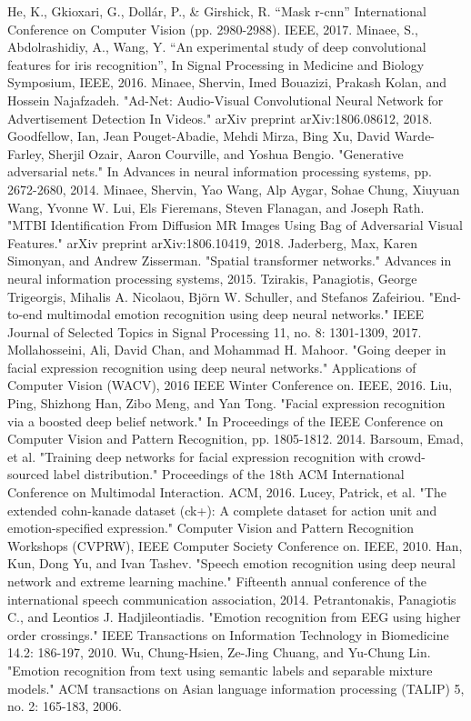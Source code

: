 \documentclass[conference]{IEEEtran}
\begin{document}
\begin{thebibliography}{1}
He, K., Gkioxari, G., Dollár, P., \& Girshick, R. ``Mask r-cnn'' International Conference on Computer Vision (pp. 2980-2988). IEEE, 2017.
Minaee, S., Abdolrashidiy, A.,  Wang, Y. ``An experimental study of deep convolutional features for iris recognition'', In Signal Processing in Medicine and Biology Symposium, IEEE, 2016.
Minaee, Shervin, Imed Bouazizi, Prakash Kolan, and Hossein Najafzadeh. "Ad-Net: Audio-Visual Convolutional Neural Network for Advertisement Detection In Videos." arXiv preprint arXiv:1806.08612, 2018.
Goodfellow, Ian, Jean Pouget-Abadie, Mehdi Mirza, Bing Xu, David Warde-Farley, Sherjil Ozair, Aaron Courville, and Yoshua Bengio. "Generative adversarial nets." In Advances in neural information processing systems, pp. 2672-2680, 2014.
Minaee, Shervin, Yao Wang, Alp Aygar, Sohae Chung, Xiuyuan Wang, Yvonne W. Lui, Els Fieremans, Steven Flanagan, and Joseph Rath. "MTBI Identification From Diffusion MR Images Using Bag of Adversarial Visual Features." arXiv preprint arXiv:1806.10419, 2018.
Jaderberg, Max, Karen Simonyan, and Andrew Zisserman. "Spatial transformer networks." Advances in neural information processing systems, 2015.
Tzirakis, Panagiotis, George Trigeorgis, Mihalis A. Nicolaou, Björn W. Schuller, and Stefanos Zafeiriou. "End-to-end multimodal emotion recognition using deep neural networks." IEEE Journal of Selected Topics in Signal Processing 11, no. 8: 1301-1309, 2017.
Mollahosseini, Ali, David Chan, and Mohammad H. Mahoor. "Going deeper in facial expression recognition using deep neural networks." Applications of Computer Vision (WACV), 2016 IEEE Winter Conference on. IEEE, 2016.
Liu, Ping, Shizhong Han, Zibo Meng, and Yan Tong. "Facial expression recognition via a boosted deep belief network." In Proceedings of the IEEE Conference on Computer Vision and Pattern Recognition, pp. 1805-1812. 2014.
Barsoum, Emad, et al. "Training deep networks for facial expression recognition with crowd-sourced label distribution." Proceedings of the 18th ACM International Conference on Multimodal Interaction. ACM, 2016.
Lucey, Patrick, et al. "The extended cohn-kanade dataset (ck+): A complete dataset for action unit and emotion-specified expression." Computer Vision and Pattern Recognition Workshops (CVPRW), IEEE Computer Society Conference on. IEEE, 2010.
Han, Kun, Dong Yu, and Ivan Tashev. "Speech emotion recognition using deep neural network and extreme learning machine." Fifteenth annual conference of the international speech communication association, 2014.
Petrantonakis, Panagiotis C., and Leontios J. Hadjileontiadis. "Emotion recognition from EEG using higher order crossings." IEEE Transactions on Information Technology in Biomedicine 14.2: 186-197, 2010.
Wu, Chung-Hsien, Ze-Jing Chuang, and Yu-Chung Lin. "Emotion recognition from text using semantic labels and separable mixture models." ACM transactions on Asian language information processing (TALIP) 5, no. 2: 165-183, 2006.


\end{thebibliography}
\end{document}
